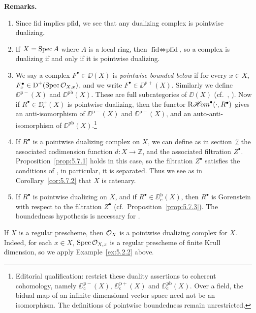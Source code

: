 \par\medskip\noindent\textbf{Remarks.}
\begin{enumerate}
\item Since fid implies pfid, we see that any dualizing complex is pointwise dualizing.
\item If $X=\operatorname{Spec} A$ where $A$ is a local ring, then $\text{fid}\iff\text{pfid}$, so a complex is dualizing if and only if it is pointwise dualizing.
\item We say a complex $F^\bullet\in\DD(X)$ is \emph{pointwise bounded below} if for every $x\in X$, $F_x^\bullet\in\operatorname{D}^+(\operatorname{Spec}\mathcal{O}_{X,x})$, and we write $F^\bullet\in\DD^{\mathrm{p}+}(X)$. Similarly we define $\DD^{\mathrm{p}-}(X)$ and $\DD^{\mathrm{pb}}(X)$. These are full subcategories of $\DD(X)$ (cf.\ , ). Now if $R^\bullet\in\DD_{\mathrm{c}}^+(X)$ is pointwise dualizing, then the functor $\mathop{\mathrm{R}\mathscr{H}\!om}\nolimits^\bullet(\cdot,R^\bullet)$ gives an anti-isomorphism of $\DD^{\mathrm{p}-}(X)$ and $\DD^{\mathrm{p}+}(X)$, and an auto-anti-isomorphism of $\DD^{\mathrm{pb}}(X)$.\footnote{Editorial qualification: restrict these duality assertions to coherent cohomology, namely $\DD_{\mathrm c}^{\mathrm p-}(X)$, $\DD_{\mathrm c}^{\mathrm p+}(X)$ and $\DD_{\mathrm c}^{\mathrm{pb}}(X)$. Over a field, the bidual map of an infinite-dimensional vector space need not be an isomorphism. The definitions of pointwise boundedness remain unrestricted.}
\item If $R^\bullet$ is a pointwise dualizing complex on $X$, we can define as in section~\hyperref[sec:5.7]{7} the associated codimension function $d\colon X\to\mathbb{Z}$, and the associated filtration $Z^\bullet$. Proposition~\ref{prop:5.7.1} holds in this case, so the filtration $Z^\bullet$ satisfies the conditions of , in particular, it is separated. Thus we see as in Corollary~\ref{cor:5.7.2} that $X$ is catenary.
\item If $R^\bullet$ is pointwise dualizing on $X$, and if $R^\bullet\in\DD_{\mathrm{c}}^{\mathrm{b}}(X)$, then $R^\bullet$ is Gorenstein with respect to the filtration $Z^\bullet$ (cf.\ Proposition~\ref{prop:5.7.3}). The boundedness hypothesis is necessary for .
\end{enumerate}
\par\medskip

\begin{example*}
If $X$ is a regular prescheme, then $\mathcal{O}_X$ is a pointwise dualizing complex for $X$. Indeed, for each $x\in X$, $\operatorname{Spec}\mathcal{O}_{X,x}$ is a regular prescheme of finite Krull dimension, so we apply Example~\ref{ex:5.2.2} above.
\end{example*}

